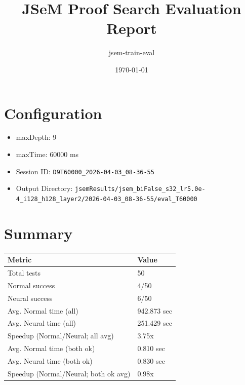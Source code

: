 \documentclass[a4paper,10pt]{article}
\title{JSeM Proof Search Evaluation Report}
\author{jsem-train-eval}
\date{\today}
\begin{document}
\maketitle

\section{Configuration}
\begin{itemize}
\item maxDepth: 9
\item maxTime: 60000 ms
\item Session ID: \texttt{D9T60000\_2026-04-03\_08-36-55}
\item Output Directory: \texttt{jsemResults/jsem\_biFalse\_s32\_lr5.0e-4\_i128\_h128\_layer2/2026-04-03\_08-36-55/eval\_T60000}
\end{itemize}

\section{Summary}
\begin{tabular}{ll}
\toprule
\textbf{Metric} & \textbf{Value} \\
\midrule
Total tests & 50 \\
Normal success & 4/50 \\
Neural success & 6/50 \\
\midrule
Avg. Normal time (all) & 942.873 sec \\
Avg. Neural time (all) & 251.429 sec \\
Speedup (Normal/Neural; all avg) & 3.75x \\
Avg. Normal time (both ok) & 0.810 sec \\
Avg. Neural time (both ok) & 0.830 sec \\
Speedup (Normal/Neural; both ok avg) & 0.98x \\
\bottomrule
\end{tabular}
\end{document}
